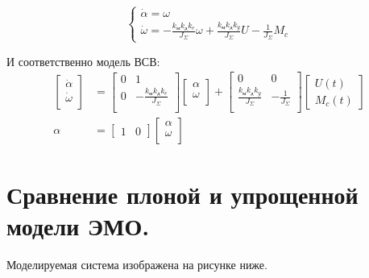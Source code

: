 \documentclass[a4paper, 11pt]{article}
\begin{document}
\begin{equation}
    \begin{cases}
    \dot{\alpha} = \omega \\
    \dot{\omega} = -\frac{k_\text{м}k_\text{д}k_e}{J_\Sigma}\omega + \frac{k_\text{м}k_\text{д}k_y}{J_\Sigma}U - \frac{1}{J_\Sigma}M_c
    \end{cases}
\end{equation}

И соответственно модель ВСВ: 
\begin{align}
    \begin{bmatrix}
        \dot{\alpha} \\
        \dot{\omega} \\
    \end{bmatrix} & = 
    \begin{bmatrix}
        0 & 1 \\
        0 & -\frac{k_\text{м}k_\text{д}k_e}{J_\Sigma} \\
    \end{bmatrix}
    \begin{bmatrix}
        \alpha \\
        \omega \\
    \end{bmatrix} + 
    \begin{bmatrix}
        0 & 0 \\
        \frac{k_\text{м}k_\text{д}k_y}{J_\Sigma} & -\frac{1}{J_\Sigma} \\
    \end{bmatrix}
    \begin{bmatrix}
        U(t) \\
        M_c(t)
    \end{bmatrix} \\
    \alpha & = 
    \begin{bmatrix}
        1 & 0 
    \end{bmatrix}
    \begin{bmatrix}
        \alpha \\
        \omega \\
    \end{bmatrix}
\end{align}
\section*{Сравнение плоной и упрощенной модели ЭМО.}

Моделируемая система изображена на рисунке ниже.
\end{document}
